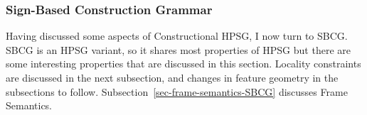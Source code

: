 \documentclass[output=paper,biblatex,babelshorthands,newtxmath,draftmode,colorlinks,citecolor=brown]{langscibook}
\begin{document}
\subsubsection{Sign-Based Construction Grammar}
\label{cxg:sec-sbcg}\label{sec-sbcg}

Having discussed some aspects of Constructional HPSG, I now turn to SBCG. SBCG is an HPSG variant,
so it shares most properties of HPSG but there are some interesting properties that are discussed in
this section. Locality constraints are discussed in the next subsection, and changes in feature geometry
in the subsections to follow. Subsection~\ref{sec-frame-semantics-SBCG} discusses Frame Semantics.

\label{sec-locality}
\end{document}
